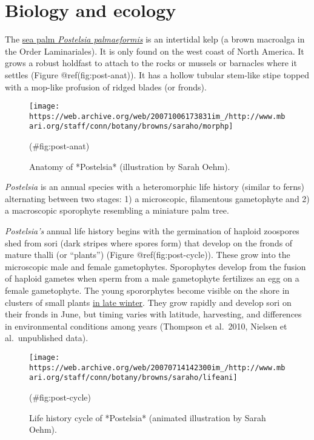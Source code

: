 \documentclass[
]{article}
\begin{document}
\newpage

\hypertarget{biology-and-ecology}{%
\section{Biology and ecology}\label{biology-and-ecology}}

The \href{https://marine.ucsc.edu/target/target-species-postelsia.html}{sea palm \emph{Postelsia palmaeformis}} is an intertidal kelp (a brown macroalga in the Order Laminariales). It is only found on the west coast of North America. It grows a robust holdfast to attach to the rocks or mussels or barnacles where it settles (Figure @ref(fig:post-anat)). It has a hollow tubular stem-like stipe topped with a mop-like profusion of ridged blades (or fronds).

\begin{figure}

\texttt{[image: https://web.archive.org/web/20071006173831im\_/http://www.mbari.org/staff/conn/botany/browns/saraho/morphp]} \hfill{}

\caption{Anatomy of *Postelsia* (illustration by Sarah Oehm).}(\#fig:post-anat)
\end{figure}

\emph{Postelsia} is an annual species with a heteromorphic life history (similar to ferns) alternating between two stages: 1) a microscopic, filamentous gametophyte and 2) a macroscopic sporophyte resembling a miniature palm tree.

\emph{Postelsia's} annual life history begins with the germination of haploid zoospores shed from sori (dark stripes where spores form) that develop on the fronds of mature thalli (or ``plants'') (Figure @ref(fig:post-cycle)). These grow into the microscopic male and female gametophytes. Sporophytes develop from the fusion of haploid gametes when sperm from a male gametophyte fertilizes an egg on a female gametophyte. The young spororphytes become visible on the shore in clusters of small plants \href{https://bodegahead.blogspot.com/search/label/postelsia}{in late winter}. They grow rapidly and develop sori on their fronds in June, but timing varies with latitude, harvesting, and differences in environmental conditions among years (Thompson et al.~2010, Nielsen et al.~unpublished data).

\begin{figure}

\texttt{[image: https://web.archive.org/web/20070714142300im\_/http://www.mbari.org/staff/conn/botany/browns/saraho/lifeani]} \hfill{}

\caption{Life history cycle of *Postelsia* (animated illustration by Sarah Oehm).}(\#fig:post-cycle)
\end{figure}
\end{document}
